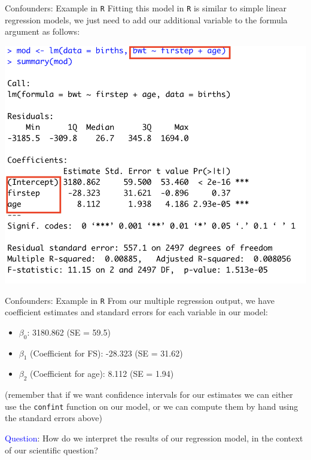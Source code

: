 \documentclass[10pt,t]{beamer}
\begin{document}
\begin{frame}{Confounders: Example in \texttt{R}}
Fitting this model in \texttt{R} is similar to simple linear regression models, we just need to add our additional variable to the formula argument as follows:

\vspace{0.3cm}

\centering \includegraphics[scale=0.4]{confound_code2.png}
\end{frame}

\begin{frame}{Confounders: Example in \texttt{R}}
From our multiple regression output, we have coefficient estimates and standard errors for each variable in our model:

\vspace{0.3cm}

\begin{itemize}
	\item $\beta_0$: 3180.862 (SE = 59.5)
	\item $\beta_1$ (Coefficient for FS): -28.323 (SE = 31.62)
	\item $\beta_2$ (Coefficient for age): 8.112 (SE = 1.94)
\end{itemize}

\vspace{0.3cm}
	
(remember that if we want confidence intervals for our estimates we can either use the \texttt{confint} function on our model, or we can compute them by hand using the standard errors above)

\vspace{0.3cm}

\textcolor{blue}{Question}: How do we interpret the results of our regression model, in the context of our scientific question?

	
\end{frame}
\end{document}

